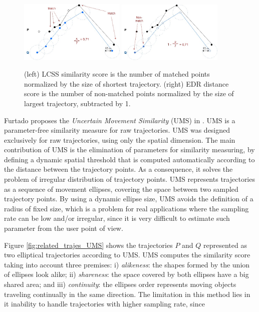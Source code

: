 \begin{figure}[h]
\centering
\includegraphics[width=0.45\textwidth]{Related_Works/related_trajes-LCSS.jpg}
\includegraphics[width=0.45\textwidth]{Related_Works/related_trajes-EDR.jpg}
\caption{\label{fig:related_trajes_EDR_LCSS}(left) LCSS similarity score is the number of matched points normalized by the size of shortest trajectory. (right) EDR distance score is the number of non-matched points normalized by the size of largest trajectory, subtracted by 1.}
\end{figure}

Furtado proposes the \emph{Uncertain Movement Similarity} (UMS) in \cite{Furtado-UMS-2018}. UMS is a parameter-free similarity measure for raw trajectories. UMS was designed exclusively for raw trajectories, using only the spatial dimension. The main contribution of UMS is the elimination of parameters for similarity measuring, by defining a dynamic spatial threshold that is computed automatically according to the distance between the trajectory points. As a consequence, it solves the problem of irregular distribution of trajectory points. UMS represents trajectories as a sequence of movement ellipses, covering the space between two sampled trajectory points.
By using a dynamic ellipse size,  UMS avoids the definition of a radius of fixed size, which is a problem for real applications where the sampling rate can be low and/or irregular, since it is very difficult to estimate such parameter from the user point of view.

Figure \ref{fig:related_trajes_UMS} shows the trajectories $P$ and $Q$ represented as two elliptical trajectories according to UMS. UMS computes the similarity score taking into account three premises: i) \textit{alikeness}: the shapes formed by the union of ellipses look alike; ii) \textit{shareness}: the space covered by both ellipses have a {big shared} area; and iii) \textit{continuity}: the ellipses order represents moving objects traveling continually in the same direction. The limitation in this method lies in it inability to handle trajectories with higher sampling rate, since 

